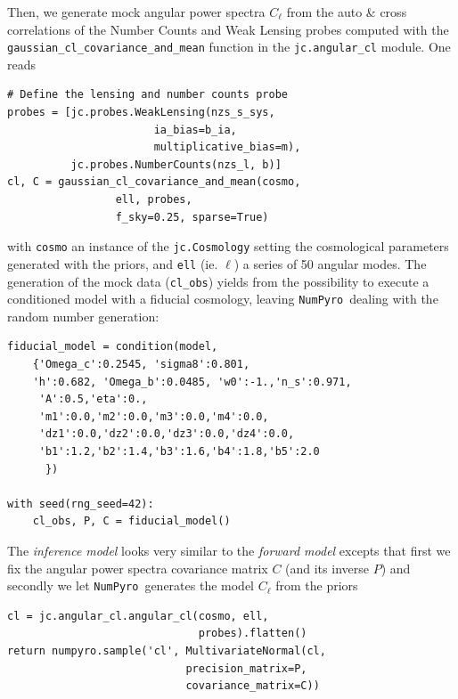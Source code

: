 \documentclass[twocolumn,twocolappendix,nofootinbib,iop]{openjournal}
\newcommand{\numpyro}{\texttt{NumPyro}}
\begin{document}
Then, we generate mock angular power spectra $C_\ell$ from the auto \& cross correlations of the Number Counts and Weak Lensing probes computed with the \texttt{gaussian\_cl\_covariance\_and\_mean} function in the \texttt{jc.angular\_cl} module. One reads
\begin{lstlisting}[language=iPython]
# Define the lensing and number counts probe
probes = [jc.probes.WeakLensing(nzs_s_sys, 
                       ia_bias=b_ia,
                       multiplicative_bias=m),
          jc.probes.NumberCounts(nzs_l, b)]
cl, C = gaussian_cl_covariance_and_mean(cosmo, 
                 ell, probes, 
                 f_sky=0.25, sparse=True)
\end{lstlisting}
with \texttt{cosmo} an instance of the \texttt{jc.Cosmology} setting the cosmological parameters generated with the priors, and \texttt{ell} (ie. $\ell$) a series of 50 angular modes. The generation of the mock data (\texttt{cl\_obs}) yields from the possibility to execute a conditioned model with a fiducial cosmology, leaving \numpyro\ dealing with the random number generation:
\begin{lstlisting}[language=iPython]
fiducial_model = condition(model,
    {'Omega_c':0.2545, 'sigma8':0.801, 
    'h':0.682, 'Omega_b':0.0485, 'w0':-1.,'n_s':0.971,
     'A':0.5,'eta':0.,
     'm1':0.0,'m2':0.0,'m3':0.0,'m4':0.0,
     'dz1':0.0,'dz2':0.0,'dz3':0.0,'dz4':0.0,
     'b1':1.2,'b2':1.4,'b3':1.6,'b4':1.8,'b5':2.0
      })

with seed(rng_seed=42):
    cl_obs, P, C = fiducial_model()
\end{lstlisting}

The \textit{inference model} looks very similar to the \textit{forward model} excepts that first we fix the angular power spectra covariance matrix $C$ (and its inverse $P$) and secondly we let \numpyro\ generates the model $C_{\ell}$ from the priors
\begin{lstlisting}[language=iPython]
cl = jc.angular_cl.angular_cl(cosmo, ell, 
                              probes).flatten()
return numpyro.sample('cl', MultivariateNormal(cl, 
                            precision_matrix=P,
                            covariance_matrix=C))
\end{lstlisting}
\end{document}
